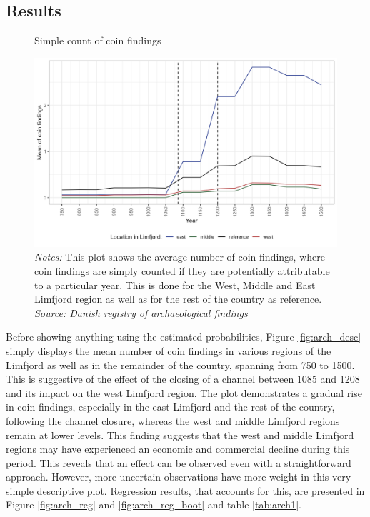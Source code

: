 \documentclass[11pt]{article}
\begin{document}
\FloatBarrier
\subsection{Results}

\begin{figure}[H]
     \centering
     \caption{Simple count of coin findings}\label{fig:arch_desc}
     \includegraphics[width=\textwidth]{Plots/Arch_descriptive.png}
     \parbox{0.9\textwidth}{
     \caption*{\footnotesize \textit{Notes:} This plot shows the average number of coin findings, where coin findings are simply counted if they are potentially attributable to a particular year. This is done for the West, Middle and East Limfjord region as well as for the rest of the country as reference. \\ \textit{Source: Danish registry of archaeological findings}}
}
     \label{fig:regpops}
\end{figure}

Before showing anything using the estimated probabilities, Figure \ref{fig:arch_desc} simply displays the mean number of coin findings in various regions of the Limfjord as well as in the remainder of the country, spanning from 750 to 1500. This is suggestive of the effect of the closing of a channel between 1085 and 1208 and its impact on the west Limfjord region. The plot demonstrates a gradual rise in coin findings, especially in the east Limfjord and the rest of the country, following the channel closure, whereas the west and middle Limfjord regions remain at lower levels. This finding suggests that the west and middle Limfjord regions may have experienced an economic and commercial decline during this period. This reveals that an effect can be observed even with a straightforward approach. However, more uncertain observations have more weight in this very simple descriptive plot. Regression results, that accounts for this, are presented in Figure \ref{fig:arch_reg} and \ref{fig:arch_reg_boot} and table \ref{tab:arch1}.
\end{document}
